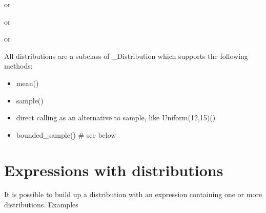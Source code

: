 \documentclass[letterpaper,10pt,english]{sphinxmanual}
\begin{document}
or

%
\begin{sphinxVerbatim}[commandchars=\\\{\}]
 
\end{sphinxVerbatim}

or

%
\begin{sphinxVerbatim}[commandchars=\\\{\}]
 
\end{sphinxVerbatim}

or

%
\begin{sphinxVerbatim}[commandchars=\\\{\}]
 
\end{sphinxVerbatim}

All distributions are a subclass of \_Distribution which supports the following methods:
\begin{itemize}
\item {} 
mean()

\item {} 
sample()

\item {} 
direct calling as an alternative to sample, like Uniform(12,15)()

\item {} 
bounded\_sample()  \# see below

\end{itemize}


\section{Expressions with distributions}
\label{\detokenize{Distributions:expressions-with-distributions}}
It is possible to build up a distribution with an expression containing one or more distributions. Examples
\end{document}
